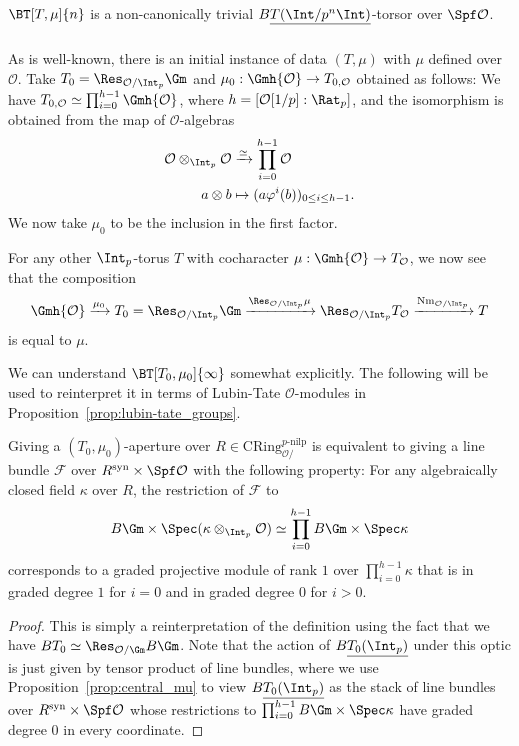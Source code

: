 \documentclass[10pt]{amsart}
\begin{document}
\begin{proposition}
\label{prop:tori}
$\BT[T,\mu]{n}$ is a non-canonically trivial $B\underline{T(\Int/p^n\Int)}$-torsor over $\Spf \mathcal{O}$.
\end{proposition} 

\subsubsection{}
As is well-known, there is an initial instance of data $(T,\mu)$ with $\mu$ defined over $\mathcal{O}$. Take $T_0 = \Res_{\mathcal{O}/\Int_p}\Gm$ and $\mu_0:\Gmh{\mathcal{O}}\to T_{0,\mathcal{O}}$ obtained as follows: We have $T_{0,\mathcal{O}} \simeq \prod_{i=0}^{h-1}\Gmh{\mathcal{O}}$, where $h = [\mathcal{O}[1/p]:\Rat_p]$, and the isomorphism is obtained from the map of $\mathcal{O}$-algebras
\begin{align*}
\mathcal{O}\otimes_{\Int_p}\mathcal{O}&\xrightarrow{\simeq}\prod_{i=0}^{h-1}\mathcal{O}\\
a\otimes b&\mapsto (a\varphi^i(b))_{0\leq i\leq h-1}.
\end{align*}
We now take $\mu_0$ to be the inclusion in the first factor. 

For any other $\Int_p$-torus $T$ with cocharacter $\mu:\Gmh{\mathcal{O}}\to T_{\mathcal{O}}$, we now see that the composition
\[
\Gmh{\mathcal{O}}\xrightarrow{\mu_0}T_0 = \Res_{\mathcal{O}/\Int_p}\Gm\xrightarrow{\Res_{\mathcal{O}/\Int_p}\mu}\Res_{\mathcal{O}/\Int_p}T_{\mathcal{O}}\xrightarrow{\mathrm{Nm}_{\mathcal{O}/\Int_p}}T
\]
is equal to $\mu$. 

We can understand $\BT[T_0,\mu_0]{\infty}$ somewhat explicitly. The following will be used to reinterpret it in terms of Lubin-Tate $\mathcal{O}$-modules in Proposition~\ref{prop:lubin-tate_groups}.

\begin{proposition}
\label{prop:lubin-tate}
Giving a $(T_0,\mu_0)$-aperture over $R\in \mathrm{CRing}^{p\text{-nilp}}_{\mathcal{O}/}$ is equivalent to giving a line bundle $\mathcal{F}$ over $R^{\mathrm{syn}}\times \Spf \mathcal{O}$ with the following property: For any algebraically closed field $\kappa$ over $R$, the restriction of $\mathcal{F}$ to 
\[
B\Gm\times\Spec(\kappa\otimes_{\Int_p}\mathcal{O}) \simeq \prod_{i=0}^{h-1}B\Gm\times\Spec \kappa
\]
corresponds to a graded projective module of rank $1$ over $\prod_{i=0}^{h-1}\kappa$ that is in graded degree $1$ for $i=0$ and in graded degree $0$ for $i>0$.
\end{proposition} 
\begin{proof}
This is simply a reinterpretation of the definition using the fact that we have $BT_0 \simeq \Res_{\mathcal{O}/\Gm}B\Gm$. Note that the action of $B\underline{T_0(\Int_p)}$ under this optic is just given by tensor product of line bundles, where we use Proposition~\ref{prop:central_mu} to view $B\underline{T_0(\Int_p)}$ as the stack of line bundles over $R^{\mathrm{syn}}\times\Spf \mathcal{O}$ whose restrictions to $\prod_{i=0}^{h-1}B\Gm\times\Spec \kappa$ have graded degree $0$ in every coordinate.
\end{proof} 
\end{document}
